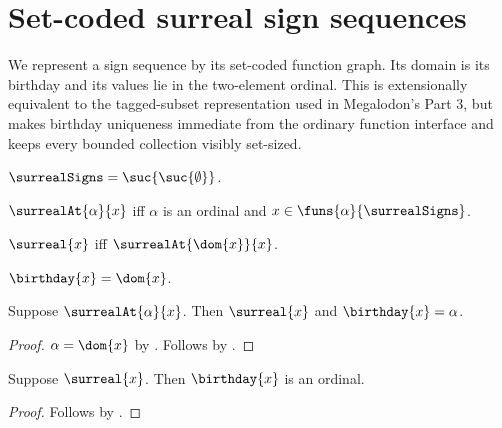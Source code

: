 



\section{Set-coded surreal sign sequences}

We represent a sign sequence by its set-coded function graph.  Its domain is
its birthday and its values lie in the two-element ordinal.  This is
extensionally equivalent to the tagged-subset representation used in
Megalodon's Part 3, but makes birthday uniqueness immediate from the ordinary
function interface and keeps every bounded collection visibly set-sized.

\begin{definition}\label{surreal_signs}
    $\surrealSigns=\suc{\suc{\emptyset}}$.
\end{definition}

\begin{definition}\label{surreal_at}
    $\surrealAt{\alpha}{x}$ iff
        $\alpha$ is an ordinal and
        $x\in\funs{\alpha}{\surrealSigns}$.
\end{definition}

\begin{definition}\label{surreal}
    $\surreal{x}$ iff $\surrealAt{\dom{x}}{x}$.
\end{definition}

\begin{definition}\label{surreal_birthday}
    $\birthday{x}=\dom{x}$.
\end{definition}

\begin{proposition}\label{surreal_at_implies_surreal}
    Suppose $\surrealAt{\alpha}{x}$.
    Then $\surreal{x}$ and $\birthday{x}=\alpha$.
\end{proposition}
\begin{proof}
    $\alpha=\dom{x}$ by .
    Follows by .
\end{proof}

\begin{proposition}\label{surreal_birthday_ordinal}
    Suppose $\surreal{x}$.
    Then $\birthday{x}$ is an ordinal.
\end{proposition}
\begin{proof}
    Follows by .
\end{proof}

